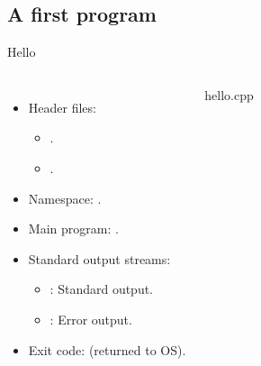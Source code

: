 \subsection{A first program}

\begin{frame}{Hello}
\begin{columns}[T]

  \begin{itemize}
    \item Header files: 
      \begin{itemize}
        \item {}.
        \item {}.
      \end{itemize}
    \item Namespace: .
    \item Main program: .
    \item Standard output streams: 
        \begin{itemize}
          \item {}: Standard output.
          \item {}: Error output.
        \end{itemize}
    \item Exit code:  (returned to OS).
  \end{itemize}

\begin{block}{hello.cpp}

\end{block}

\end{columns}
\end{frame}
